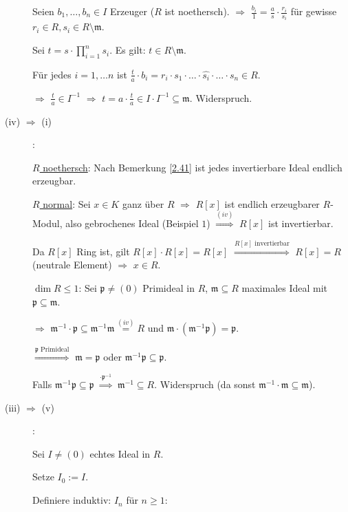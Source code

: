 \begin{Bew}
\begin{description}
Seien $b_1, \ldots, b_n \in I$ Erzeuger ($R$ ist noethersch). $\Rightarrow$
$\frac{b_i}{1} = \frac{a}{s} \cdot \frac{r_i}{s_i}$ f\"ur gewisse $r_i \in R,
s_i \in R \setminus \mathfrak{m}$.

Sei $t = s \cdot \prod_{i=1}^{n} s_i$. Es gilt: $t \in R \setminus \mathfrak{m}$.

F\"ur jedes $i = 1, \ldots n$ ist $\frac{t}{a} \cdot b_i = r_i \cdot s_1 \cdot \ldots \cdot \widehat{s_i} \cdot \ldots \cdot s_n \in R$.

$\Rightarrow$ $\frac{t}{a} \in I^{-1}$ $\Rightarrow$ $t = a \cdot \frac{t}{a} \in I \cdot I^{-1} \subseteq \mathfrak{m}$. Widerspruch.

\item[(iv) $\Rightarrow$ (i)]:

\underline{$R$ noethersch}: Nach Bemerkung \ref{2.41} ist jedes invertierbare Ideal endlich erzeugbar.

\underline{$R$ normal}: Sei $x \in K$ ganz \"uber $R$ $\Rightarrow$ $R[x]$ ist
endlich erzeugbarer $R$-Modul, also gebrochenes Ideal (Beispiel $1$) $\overset{(iv)}{\Rightarrow}$ $R[x]$ ist invertierbar. 

Da $R[x]$ Ring ist, gilt $R[x] \cdot R[x] = R[x]$ $\overset{R[x]\text{ invertierbar}}{\Rightarrow}$ $R[x] = R$ (neutrale Element)
$\Rightarrow$ $x \in R$.

\underline{$\dim R \leq 1$}: Sei $\mathfrak{p} \neq (0)$ Primideal in $R$, $\mathfrak{m} \subseteq R$ maximales Ideal mit $\mathfrak{p} \subseteq \mathfrak{m}$.

$\Rightarrow$ $\mathfrak{m}^{-1} \cdot \mathfrak{p} \subseteq \mathfrak{m}^{-1} \mathfrak{m} \overset{(iv)}{=} R$ und $\mathfrak{m} \cdot (\mathfrak{m}^{-1} \mathfrak{p}) = \mathfrak{p}$.

$\overset{\mathfrak{p}\text{ Primideal}}{\Rightarrow}$ $\mathfrak{m} = \mathfrak{p}$ oder $\mathfrak{m}^{-1} \mathfrak{p} \subseteq \mathfrak{p}$.

Falls $\mathfrak{m}^{-1} \mathfrak{p} \subseteq \mathfrak{p}$ $\overset{\cdot \mathfrak{p}^{-1}}{\Rightarrow}$ $\mathfrak{m}^{-1} \subseteq R$. Widerspruch (da sonst $\mathfrak{m}^{-1} \cdot \mathfrak{m} \subseteq \mathfrak{m}$).

\item[(iii) $\Rightarrow$ (v)]:

Sei $I \neq (0)$ echtes Ideal in $R$.

Setze $I_0 := I$.

Definiere induktiv: $I_n$ f\"ur $n \geq 1$:


\end{description}
\end{Bew}
